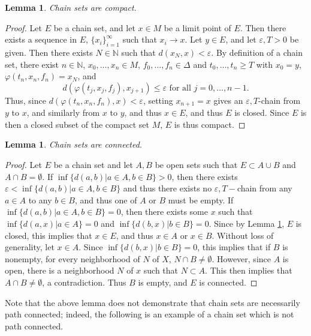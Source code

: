\documentclass[11pt]{article}
\newtheorem{lem}[thm]{Lemma}
\begin{document}
\begin{lem}  \label{compact}
Chain sets are compact.
\end{lem}
\begin{proof}
Let $E$ be a chain set, and let $x\in M$ be a limit point of $E$.  Then there exists a sequence in $E$, $\{x_i\}_{i=1}^\infty$ such that $x_i\rightarrow x$.  Let $y\in E$, and let $\varepsilon, T>0$ be given.  Then there exists $N\in\mathbb{N}$ such that $d(x_N,x)<\varepsilon$.  By definition of a chain set, there exist $n\in\mathbb{N}$, $x_0,\ldots,x_n\in M$, $f_0,\ldots,f_{n}\in\Delta$ and $t_0,\ldots,t_{n}\geq T$ with $x_0=y$, $\varphi(t_n,x_n,f_n)=x_N$, and 
$$d(\varphi(t_j,x_j,f_j),x_{j+1})\leq\varepsilon\mbox{ for all }j=0,\ldots,n-1.$$  
Thus, since $d(\varphi(t_n,x_n,f_n),x)<\varepsilon$, setting $x_{n+1}=x$ gives an $\varepsilon, T$-chain from $y$ to $x$, and similarly from $x$ to $y$, and thus $x\in E$, and thus $E$ is closed.  Since $E$ is then a closed subset of the compact set $M$, $E$ is thus compact. 
\end{proof}

\begin{lem}\label{chainconnected}
Chain sets are connected.
\end{lem}
\begin{proof}
Let $E$ be a chain set and let $A,B$ be open sets such that $E\subset A\cup B$ and $A\cap B=\emptyset$.  If $\inf\{d(a,b)|a\in A, b\in B\}>0$, then there exists $\varepsilon<\inf\{d(a,b)|a\in A, b\in B\}$ and thus there exists no $\varepsilon, T-$chain from any $a\in A$ to any $b\in B$, and thus one of $A$ or $B$ must be empty.  If $\inf\{d(a,b)|a\in A, b\in B\}=0$, then there exists some $x$ such that $\inf\{d(a,x)|a\in A\}=0$ and $\inf\{d(b,x)|b\in B\}=0$.  Since by Lemma \ref{compact}, $E$ is closed, this implies that $x\in E$, and thus $x\in A$ or $x\in B$.  Without loss of generality, let $x\in A$.  Since $\inf\{d(b,x)|b\in B\}=0$, this implies that if $B$ is nonempty, for every neighborhood of $N$ of $X$, $N\cap B\not= \emptyset$.  However, since $A$ is open, there is a neighborhood $N$ of $x$ such that $N\subset A$.  This then implies that $A\cap B\not = \emptyset$, a contradiction.  Thus $B$ is empty, and $E$ is connected.

\end{proof}

Note that the above lemma does not demonstrate that chain sets are necessarily path connected; indeed, the following is an example of a chain set which is not path connected. 
\end{document}

